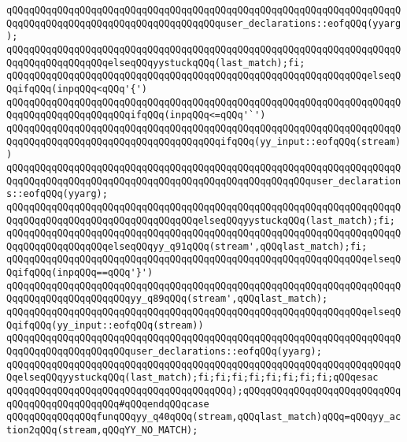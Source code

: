 \verb|qQQqqQQqqQQqqQQqqQQqqQQqqQQqqQQqqQQqqQQqqQQqqQQqqQQqqQQqqQQqqQQqqQQqqQQqqQQqqQQqqQQqqQQqqQQqqQQqqQQqqQQqqQQquser_declarations::eofqQQq(yyarg);|\newline
\verb|qQQqqQQqqQQqqQQqqQQqqQQqqQQqqQQqqQQqqQQqqQQqqQQqqQQqqQQqqQQqqQQqqQQqqQQqqQQqqQQqqQQqqQQqelseqQQqyystuckqQQq(last_match);fi;|\newline
\verb|qQQqqQQqqQQqqQQqqQQqqQQqqQQqqQQqqQQqqQQqqQQqqQQqqQQqqQQqqQQqqQQqelseqQQqifqQQq(inpqQQq<qQQq'{')|\newline
\verb|qQQqqQQqqQQqqQQqqQQqqQQqqQQqqQQqqQQqqQQqqQQqqQQqqQQqqQQqqQQqqQQqqQQqqQQqqQQqqQQqqQQqqQQqqQQqifqQQq(inpqQQq<=qQQq'`')|\newline
\verb|qQQqqQQqqQQqqQQqqQQqqQQqqQQqqQQqqQQqqQQqqQQqqQQqqQQqqQQqqQQqqQQqqQQqqQQqqQQqqQQqqQQqqQQqqQQqqQQqqQQqqQQqqQQqifqQQq(yy_input::eofqQQq(stream))|\newline
\verb|qQQqqQQqqQQqqQQqqQQqqQQqqQQqqQQqqQQqqQQqqQQqqQQqqQQqqQQqqQQqqQQqqQQqqQQqqQQqqQQqqQQqqQQqqQQqqQQqqQQqqQQqqQQqqQQqqQQqqQQqqQQquser_declarations::eofqQQq(yyarg);|\newline
\verb|qQQqqQQqqQQqqQQqqQQqqQQqqQQqqQQqqQQqqQQqqQQqqQQqqQQqqQQqqQQqqQQqqQQqqQQqqQQqqQQqqQQqqQQqqQQqqQQqqQQqqQQqelseqQQqyystuckqQQq(last_match);fi;|\newline
\verb|qQQqqQQqqQQqqQQqqQQqqQQqqQQqqQQqqQQqqQQqqQQqqQQqqQQqqQQqqQQqqQQqqQQqqQQqqQQqqQQqqQQqqQQqelseqQQqyy_q91qQQq(stream',qQQqlast_match);fi;|\newline
\verb|qQQqqQQqqQQqqQQqqQQqqQQqqQQqqQQqqQQqqQQqqQQqqQQqqQQqqQQqqQQqqQQqelseqQQqifqQQq(inpqQQq==qQQq'}')|\newline
\verb|qQQqqQQqqQQqqQQqqQQqqQQqqQQqqQQqqQQqqQQqqQQqqQQqqQQqqQQqqQQqqQQqqQQqqQQqqQQqqQQqqQQqqQQqqQQqyy_q89qQQq(stream',qQQqlast_match);|\newline
\verb|qQQqqQQqqQQqqQQqqQQqqQQqqQQqqQQqqQQqqQQqqQQqqQQqqQQqqQQqqQQqqQQqelseqQQqifqQQq(yy_input::eofqQQq(stream))|\newline
\verb|qQQqqQQqqQQqqQQqqQQqqQQqqQQqqQQqqQQqqQQqqQQqqQQqqQQqqQQqqQQqqQQqqQQqqQQqqQQqqQQqqQQqqQQqqQQquser_declarations::eofqQQq(yyarg);|\newline
\verb|qQQqqQQqqQQqqQQqqQQqqQQqqQQqqQQqqQQqqQQqqQQqqQQqqQQqqQQqqQQqqQQqqQQqqQQqelseqQQqyystuckqQQq(last_match);fi;fi;fi;fi;fi;fi;fi;fi;qQQqesac|\newline
\verb|qQQqqQQqqQQqqQQqqQQqqQQqqQQqqQQqqQQqqQQq);qQQqqQQqqQQqqQQqqQQqqQQqqQQqqQQqqQQqqQQqqQQqqQQq#qQQqendqQQqcase|\newline
\verb|qQQqqQQqqQQqqQQqfunqQQqyy_q40qQQq(stream,qQQqlast_match)qQQq=qQQqyy_action2qQQq(stream,qQQqYY_NO_MATCH);|\newline
